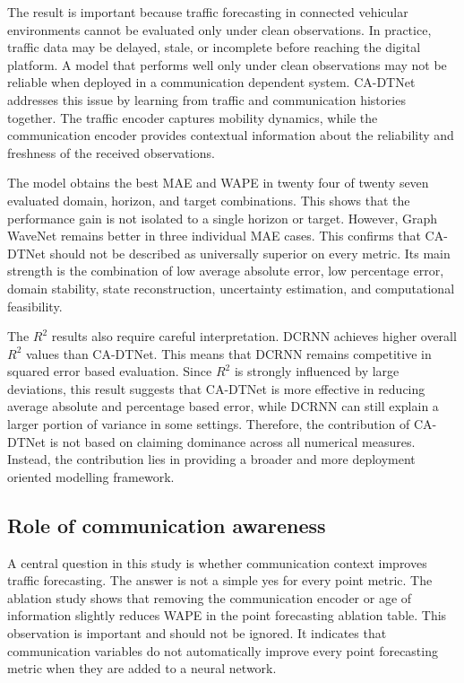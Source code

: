 \documentclass[pdflatex,sn-mathphys-num]{sn-jnl}%
\theoremstyle{thmstyleone}%
\theoremstyle{thmstyletwo}%
\theoremstyle{thmstylethree}%
\begin{document}
The result is important because traffic forecasting in connected vehicular environments cannot be evaluated only under clean observations. In practice, traffic data may be delayed, stale, or incomplete before reaching the digital platform. A model that performs well only under clean observations may not be reliable when deployed in a communication dependent system. CA-DTNet addresses this issue by learning from traffic and communication histories together. The traffic encoder captures mobility dynamics, while the communication encoder provides contextual information about the reliability and freshness of the received observations.

The model obtains the best MAE and WAPE in twenty four of twenty seven evaluated domain, horizon, and target combinations. This shows that the performance gain is not isolated to a single horizon or target. However, Graph WaveNet remains better in three individual MAE cases. This confirms that CA-DTNet should not be described as universally superior on every metric. Its main strength is the combination of low average absolute error, low percentage error, domain stability, state reconstruction, uncertainty estimation, and computational feasibility.

The \(R^{2}\) results also require careful interpretation. DCRNN achieves higher overall \(R^{2}\) values than CA-DTNet. This means that DCRNN remains competitive in squared error based evaluation. Since \(R^{2}\) is strongly influenced by large deviations, this result suggests that CA-DTNet is more effective in reducing average absolute and percentage based error, while DCRNN can still explain a larger portion of variance in some settings. Therefore, the contribution of CA-DTNet is not based on claiming dominance across all numerical measures. Instead, the contribution lies in providing a broader and more deployment oriented modelling framework.

\subsection{Role of communication awareness}
\label{subsec:discussion_communication_awareness}

A central question in this study is whether communication context improves traffic forecasting. The answer is not a simple yes for every point metric. The ablation study shows that removing the communication encoder or age of information slightly reduces WAPE in the point forecasting ablation table. This observation is important and should not be ignored. It indicates that communication variables do not automatically improve every point forecasting metric when they are added to a neural network.
\end{document}
